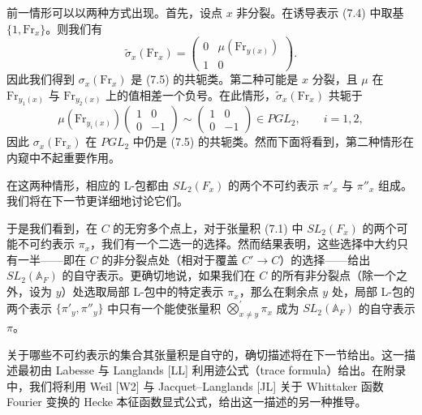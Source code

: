 前一情形可以以两种方式出现。首先，设点 $x$ 非分裂。在诱导表示 (7.4) 中取基 $\{1,\mathrm{Fr}_x\}$。则我们有
\[
\tilde\sigma_x(\mathrm{Fr}_x)=\begin{pmatrix}0&\mu(\mathrm{Fr}_{y(x)})\\ 1&0\end{pmatrix}.
\]
因此我们得到 $\sigma_x(\mathrm{Fr}_x)$ 是 (7.5) 的共轭类。第二种可能是 $x$ 分裂，且 $\mu$ 在 $\mathrm{Fr}_{y_1(x)}$ 与 $\mathrm{Fr}_{y_2(x)}$ 上的值相差一个负号。在此情形，$\tilde\sigma_x(\mathrm{Fr}_x)$ 共轭于
\begin{equation}\tag{7.6}
\mu(\mathrm{Fr}_{y_i(x)})\begin{pmatrix}1&0\\ 0&-1\end{pmatrix}\sim\begin{pmatrix}1&0\\ 0&-1\end{pmatrix}\in PGL_2,\qquad i=1,2,
\end{equation}
因此 $\sigma_x(\mathrm{Fr}_x)$ 在 $PGL_2$ 中仍是 (7.5) 的共轭类。然而下面将看到，第二种情形在内窥中不起重要作用。

在这两种情形，相应的 L-包都由 $SL_2(F_x)$ 的两个不可约表示 $\pi'_x$ 与 $\pi''_x$ 组成。我们将在下一节更详细地讨论它们。

于是我们看到，在 $C$ 的无穷多个点上，对于张量积 (7.1) 中 $SL_2(F_x)$ 的两个可能不可约表示 $\pi_x$，我们有一个二选一的选择。然而结果表明，这些选择中大约只有一半——即在 $C$ 的非分裂点处（相对于覆盖 $C'\to C$）的选择——给出 $SL_2(\mathbb{A}_F)$ 的自守表示。更确切地说，如果我们在 $C$ 的所有非分裂点（除一个之外，设为 $y$）处选取局部 L-包中的特定表示 $\pi_x$，那么在剩余点 $y$ 处，局部 L-包的两个表示 $\{\pi'_y,\pi''_y\}$ 中只有一个能使张量积 $\bigotimes_{x\neq y}^{\prime}\pi_x$ 成为 $SL_2(\mathbb{A}_F)$ 的自守表示 $\pi$。

关于哪些不可约表示的集合其张量积是自守的，确切描述将在下一节给出。这一描述最初由 Labesse 与 Langlands [LL] 利用迹公式（trace formula）给出。在附录中，我们将利用 Weil [W2] 与 Jacquet--Langlands [JL] 关于 Whittaker 函数 Fourier 变换的 Hecke 本征函数显式公式，给出这一描述的另一种推导。

